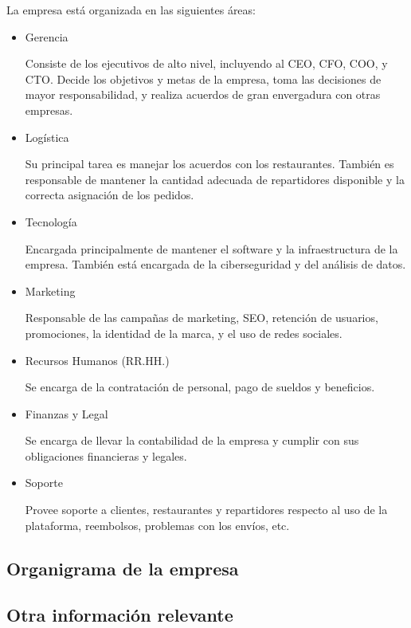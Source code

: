 \documentclass[11pt]{article}
\begin{document}
La empresa está organizada en las siguientes áreas:

\begin{itemize}
    \item Gerencia
    
    Consiste de los ejecutivos de alto nivel, incluyendo al CEO, CFO, COO, y CTO. Decide los objetivos y metas de la empresa, toma las decisiones de mayor responsabilidad, y realiza acuerdos de gran envergadura con otras empresas.

    \item Logística
    
    Su principal tarea es manejar los acuerdos con los restaurantes. También es responsable de mantener la cantidad adecuada de repartidores disponible y la correcta asignación de los pedidos.
    
    \item Tecnología
    
    Encargada principalmente de mantener el software y la infraestructura de la empresa. También está encargada de la ciberseguridad y del análisis de datos.

    \item Marketing
    
    Responsable de las campañas de marketing, SEO, retención de usuarios, promociones, la identidad de la marca, y el uso de redes sociales.

    \item Recursos Humanos (RR.HH.)
    
    Se encarga de la contratación de personal, pago de sueldos y beneficios.

    \item Finanzas y Legal
    
    Se encarga de llevar la contabilidad de la empresa y cumplir con sus obligaciones financieras y legales.

    \item Soporte
    
    Provee soporte a clientes, restaurantes y repartidores respecto al uso de la plataforma, reembolsos, problemas con los envíos, etc.    
    
    
\end{itemize}

\subsection{Organigrama de la empresa}

\subsection{Otra información relevante}
\end{document}
